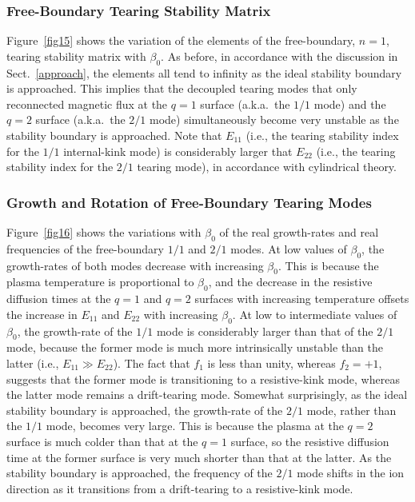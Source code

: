 \documentclass[12pt,prb,aps]{revtex4-1}
\begin{document}
\subsubsection{Free-Boundary Tearing Stability Matrix}
Figure~\ref{fig15} shows the variation of the elements of the free-boundary, $n=1$, tearing stability matrix with $\beta_0$. As before, in accordance with the discussion in
Sect.~\ref{approach}, the elements all tend to infinity as the ideal stability boundary is approached. This implies that the decoupled tearing modes that
only reconnected magnetic flux at the $q=1$ surface (a.k.a.\ the $1/1$ mode) and the $q=2$ surface  (a.k.a.\ the $2/1$ mode)   simultaneously become very unstable as the
stability boundary is approached. Note that $E_{11}$ (i.e., the tearing stability index for the $1/1$ internal-kink mode) is
considerably larger that $E_{22}$ (i.e., the tearing stability index for the $2/1$ tearing mode), in accordance with cylindrical theory.\cite{freidberg,wesson}

\subsubsection{Growth and Rotation of Free-Boundary Tearing Modes}
Figure~\ref{fig16} shows the variations  with $\beta_0$ of the real growth-rates and real frequencies of the free-boundary $1/1$ and $2/1$ modes.  At low values of $\beta_0$, the growth-rates of both modes decrease with increasing
$\beta_0$. This is because  the plasma temperature is proportional to $\beta_0$, and the decrease in the resistive diffusion times at the $q=1$ and $q=2$ surfaces
with increasing temperature offsets the increase in $E_{11}$ and $E_{22}$ with increasing $\beta_0$. 
At low to intermediate values of $\beta_0$, the growth-rate
of the $1/1$ mode is considerably larger than that of the $2/1$ mode, because the former mode is much more intrinsically
unstable than the latter (i.e., $E_{11}\gg E_{22}$). The fact that $f_1$ is less than unity, whereas $f_2=+1$,  suggests that the former mode is transitioning to a resistive-kink mode,
whereas the latter mode remains a drift-tearing mode.\cite{ara} Somewhat surprisingly, as the ideal stability boundary is approached, the growth-rate of the
$2/1$ mode, rather than the $1/1$ mode, becomes very large.  This is because
the plasma at the $q=2$ surface is much colder than that at the $q=1$ surface, so the resistive diffusion time at the former surface is very much  shorter than
that at the latter. As the stability boundary is approached, the frequency of the  $2/1$ mode shifts  in the ion direction as it
transitions from a drift-tearing to a resistive-kink mode.\cite{ara}
\end{document}
